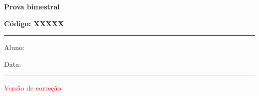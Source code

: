 \documentclass[12pt, addpoints]{exam}
\begin{document}
\newpage
\begin{minipage}[l]{0.5\linewidth}
    \begin{flushleft}
        {\bf \Large Prova bimestral}
    \end{flushleft}
\end{minipage}
\begin{minipage}[r]{0.45\linewidth}
    \begin{flushright}
        {\bf \Large Código: XXXXX}
    \end{flushright}
\end{minipage}
\vspace{0.5cm} \hrule \vspace{0.5cm}
\begin{minipage}{0.75\linewidth}
    Aluno:
\end{minipage}
\begin{minipage}{0.20\linewidth}
    Data: 
\end{minipage}
\vspace{0.5cm} \hrule \vspace{0.5cm}
\begin{center}
    \textcolor{red}{\large Versão de correção}
\end{center}
\end{document}
